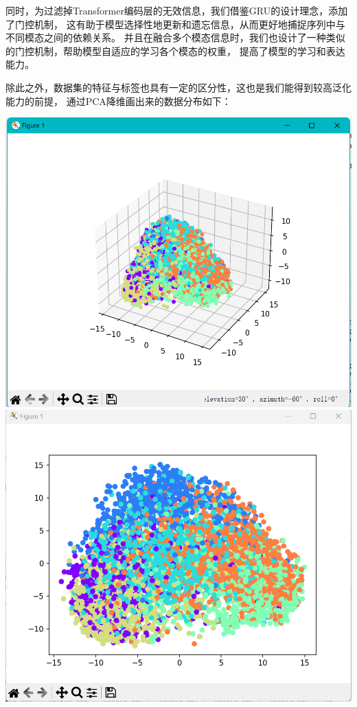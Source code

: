 \documentclass[11pt]{article}
\begin{document}
            同时，为过滤掉Transformer编码层的无效信息，我们借鉴GRU的设计理念，添加了门控机制，
            这有助于模型选择性地更新和遗忘信息，从而更好地捕捉序列中与不同模态之间的依赖关系。
            并且在融合多个模态信息时，我们也设计了一种类似的门控机制，帮助模型自适应的学习各个模态的权重，
            提高了模型的学习和表达能力。
            
            除此之外，数据集的特征与标签也具有一定的区分性，这也是我们能得到较高泛化能力的前提，
            通过PCA降维画出来的数据分布如下：

            \begin{center}
                \includegraphics[scale=0.8]{graph/transformer3.png}\\
                \includegraphics[scale=0.8]{graph/transformer4.png}
            \end{center}
\end{document}

